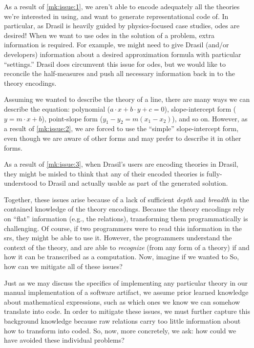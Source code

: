 As a result of \ref{mk:issue:1}, we aren't able to encode adequately all the
theories we're interested in using, and want to generate representational code
of. In particular, as Drasil is heavily guided by physics-focused case studies,
\acsp{ode} are desired! When we want to use \acsp{ode} in the solution of a
problem, extra information is required. For example, we might need to give
Drasil (and/or developers) information about a desired approximation formula
with particular ``settings.'' Drasil does circumvent this issue for \acsp{ode},
but we would like to reconcile the half-measures and push all necessary
information back in to the theory encodings.

Assuming we wanted to describe the theory of a line, there are many ways we can
describe the equation: polynomial (\(a \cdot{} x + b \cdot{} y + c = 0\)),
slope-intercept form (\(y = m \cdot{} x + b\)), point-slope form (\(y_1 - y_2 =
m(x_1 - x_2)\)), and so on. However, as a result of \ref{mk:issue:2}, we are
forced to use the ``simple'' slope-intercept form, even though we are aware of
other forms and may prefer to describe it in other forms.

As a result of \ref{mk:issue:3}, when Drasil's users are encoding theories in
Drasil, they might be misled to think that any of their encoded theories is
fully-understood to Drasil and actually usable as part of the generated solution.

Together, these issues arise because of a lack of sufficient \textit{depth} and
\textit{breadth} in the contained knowledge of the theory encodings. Because the
theory encodings rely on ``flat'' information (e.g., the relations),
transforming them programmatically is challenging. Of course, if two programmers
were to read this information in the \acs{srs}, they might be able to use it.
However, the programmers understand the context of the theory, and are able to
\textit{recognize} (from any form of a theory) if and how it can be transcribed
as a computation. Now, imagine if we wanted to  So, how can we mitigate all of
these issues?

Just as we may discuss the specifics of implementing any particular theory in
our manual implementation of a software artifact, we assume prior learned
knowledge about mathematical expressions, such as which ones we know we can
somehow translate into code. In order to mitigate these issues, we must further
capture this background knowledge because raw relations carry too little
information about how to transform into coded. So, now, more concretely, we ask:
how could we have avoided these individual problems?

